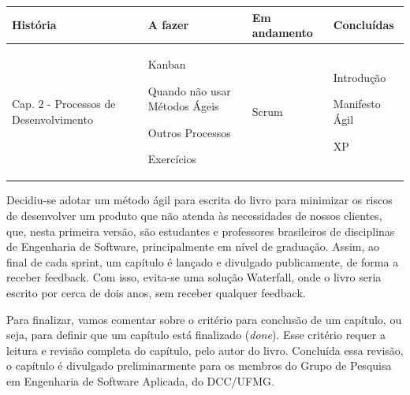 \documentclass[
  11pt,
  twoside]{book}
\begin{document}
\begin{longtable}[]{@{}llll@{}}
\toprule
\begin{minipage}[b]{0.22\columnwidth}\raggedright
\textbf{História}\strut
\end{minipage} & \begin{minipage}[b]{0.21\columnwidth}\raggedright
\textbf{A fazer}\strut
\end{minipage} & \begin{minipage}[b]{0.21\columnwidth}\raggedright
\textbf{Em andamento}\strut
\end{minipage} & \begin{minipage}[b]{0.21\columnwidth}\raggedright
\textbf{Concluídas}\strut
\end{minipage}\tabularnewline
\midrule
\endhead
\begin{minipage}[t]{0.22\columnwidth}\raggedright
Cap. 2 - Processos de Desenvolvimento\strut
\end{minipage} & \begin{minipage}[t]{0.21\columnwidth}\raggedright
Kanban

Quando não usar Métodos Ágeis

Outros Processos

Exercícios\strut
\end{minipage} & \begin{minipage}[t]{0.21\columnwidth}\raggedright
Scrum\strut
\end{minipage} & \begin{minipage}[t]{0.21\columnwidth}\raggedright
Introdução

Manifesto Ágil

XP\strut
\end{minipage}\tabularnewline
\bottomrule
\end{longtable}

Decidiu-se adotar um método ágil para escrita do livro para minimizar os
riscos de desenvolver um produto que não atenda às necessidades de
nossos clientes, que, nesta primeira versão, são estudantes e
professores brasileiros de disciplinas de Engenharia de Software,
principalmente em nível de graduação. Assim, ao final de cada sprint, um
capítulo é lançado e divulgado publicamente, de forma a receber
feedback. Com isso, evita-se uma solução Waterfall, onde o livro seria
escrito por cerca de dois anos, sem receber qualquer feedback.

Para finalizar, vamos comentar sobre o critério para conclusão de um
capítulo, ou seja, para definir que um capítulo está finalizado
(\emph{done}). Esse critério requer a leitura e revisão completa do
capítulo, pelo autor do livro. Concluída essa revisão, o capítulo é
divulgado preliminarmente para os membros do Grupo de Pesquisa em
Engenharia de Software Aplicada, do DCC/UFMG.
\end{document}
